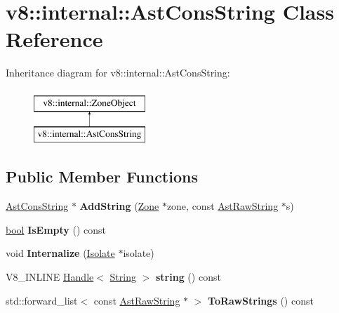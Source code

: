 \hypertarget{classv8_1_1internal_1_1AstConsString}{}\section{v8\+:\+:internal\+:\+:Ast\+Cons\+String Class Reference}
\label{classv8_1_1internal_1_1AstConsString}
Inheritance diagram for v8\+:\+:internal\+:\+:Ast\+Cons\+String\+:\begin{figure}[H]
\begin{center}
\leavevmode
\includegraphics[height=2.000000cm]{classv8_1_1internal_1_1AstConsString}
\end{center}
\end{figure}
\subsection*{Public Member Functions}
\begin{DoxyCompactItemize}
\item 
\mbox{\label{classv8_1_1internal_1_1AstConsString_aa472e4ec4d1351fe7b74e43dd570c6be}} 
\mbox{\hyperlink{classv8_1_1internal_1_1AstConsString}{Ast\+Cons\+String}} $\ast$ {\bfseries Add\+String} (\mbox{\hyperlink{classv8_1_1internal_1_1Zone}{Zone}} $\ast$zone, const \mbox{\hyperlink{classv8_1_1internal_1_1AstRawString}{Ast\+Raw\+String}} $\ast$s)
\item 
\mbox{\label{classv8_1_1internal_1_1AstConsString_a17a92870fea4f30664c9eed10eaf22f2}} 
\mbox{\hyperlink{classbool}{bool}} {\bfseries Is\+Empty} () const
\item 
\mbox{\label{classv8_1_1internal_1_1AstConsString_ae3dabbb3ea951ee7328f4d3b1b606e59}} 
void {\bfseries Internalize} (\mbox{\hyperlink{classv8_1_1internal_1_1Isolate}{Isolate}} $\ast$isolate)
\item 
\mbox{\label{classv8_1_1internal_1_1AstConsString_a69a36a12ec1af8e0e9d6362ef6ea03c8}} 
V8\+\_\+\+I\+N\+L\+I\+NE \mbox{\hyperlink{classv8_1_1internal_1_1Handle}{Handle}}$<$ \mbox{\hyperlink{classv8_1_1internal_1_1String}{String}} $>$ {\bfseries string} () const
\item 
\mbox{\label{classv8_1_1internal_1_1AstConsString_a9e6b8ed9e5514f50e26138d067bdc2a9}} 
std\+::forward\+\_\+list$<$ const \mbox{\hyperlink{classv8_1_1internal_1_1AstRawString}{Ast\+Raw\+String}} $\ast$ $>$ {\bfseries To\+Raw\+Strings} () const
\end{DoxyCompactItemize}
